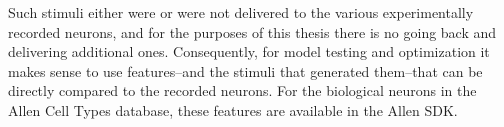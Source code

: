 
Such stimuli either were or were not delivered to the various experimentally recorded neurons, and for the purposes of this thesis there is no going back and delivering additional ones.
Consequently, for model testing and optimization it makes sense to use features--and the stimuli that generated them--that can be directly compared to the recorded neurons.
For the biological neurons in the Allen Cell Types database, these features are available in the Allen SDK.
